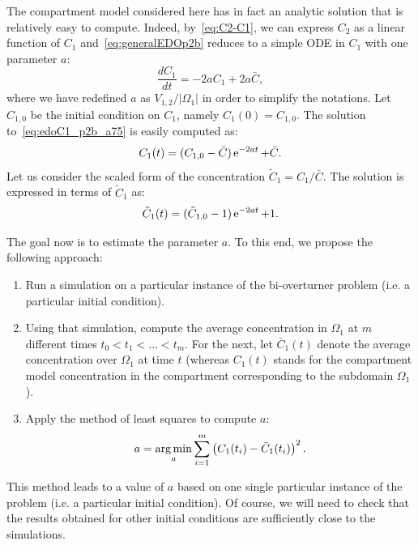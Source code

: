 The compartment model considered here has in fact an analytic solution that is relatively easy to compute. Indeed, by~\eqref{eq:C2-C1}, we can express $C_2$ as a linear function of $C_1$ and~\eqref{eq:generalEDOp2b} reduces to a simple ODE in $C_1$ with one parameter $a$:
\begin{equation} \label{eq:edoC1_p2b_a75}
	\frac{dC_1}{dt} = -2aC_1 + 2a\bar C,
\end{equation}
where we have redefined $a$ as $V_{1,2}/|\Omega_1|$ in order to simplify the notations. Let $C_{1,0}$ be the initial condition on $C_1$, namely $C_1(0) = C_{1,0}$. The solution to~\eqref{eq:edoC1_p2b_a75} is easily computed as:
\begin{equation}
	C_1(t) = (C_{1,0} - \bar C) \operatorname{e}^{-2at} + \bar C.
\end{equation}
Let us consider the scaled form of the concentration $\tilde C_1 = C_1/\bar C$. The solution is expressed in terms of $\tilde C_1$ as:
\begin{equation}
	\tilde C_1(t) = (\tilde C_{1,0} - 1) \operatorname{e}^{-2at} + 1.
\end{equation}

The goal now is to estimate the parameter $a$. To this end, we propose the following approach:
\begin{enumerate}
	\item Run a simulation on a particular instance of the bi-overturner problem (i.e. a particular initial condition).
	\item Using that simulation, compute the average concentration in $\Omega_1$ at $m$ different times $t_0 < t_1 < \dots < t_m$. For the next, let $\bar C_1(t)$ denote the average concentration over $\Omega_1$ at time $t$ (whereas $C_1(t)$ stands for the compartment model concentration in the compartment corresponding to the subdomain $\Omega_1$).
	\item Apply the method of least squares to compute $a$:
	\begin{equation} \label{eq:a_minimization}
		a = \operatorname*{arg\,min}_a \sum_{i=1}^m \left(C_1(t_i)-\bar C_1(t_i)\right)^2.
	\end{equation}
\end{enumerate}
This method leads to a value of $a$ based on one single particular instance of the problem (i.e. a particular initial condition). Of course, we will need to check that the results obtained for other initial conditions are sufficiently close to the simulations.

